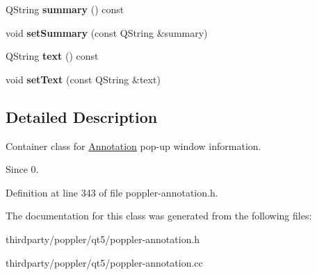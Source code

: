 \begin{DoxyCompactItemize}
Q\+String {\bfseries summary} () const
\item 
\mbox{\label{class_poppler_1_1_annotation_1_1_popup_add36d0136076e26da3820c2b19ccfdd1}} 
void {\bfseries set\+Summary} (const Q\+String \&summary)
\item 
\mbox{\label{class_poppler_1_1_annotation_1_1_popup_a41a3efe82763a1aefbe9959cff21b3df}} 
Q\+String {\bfseries text} () const
\item 
\mbox{\label{class_poppler_1_1_annotation_1_1_popup_ae4641f2fb7d82a28e89af6cb2883db49}} 
void {\bfseries set\+Text} (const Q\+String \&text)
\end{DoxyCompactItemize}


\subsection{Detailed Description}
Container class for \hyperlink{class_poppler_1_1_annotation}{Annotation} pop-\/up window information. 

\begin{DoxySince}{Since}
0. 
\end{DoxySince}


Definition at line 343 of file poppler-\/annotation.\+h.



The documentation for this class was generated from the following files\+:\begin{DoxyCompactItemize}
\item 
thirdparty/poppler/qt5/poppler-\/annotation.\+h\item 
thirdparty/poppler/qt5/poppler-\/annotation.\+cc\end{DoxyCompactItemize}
